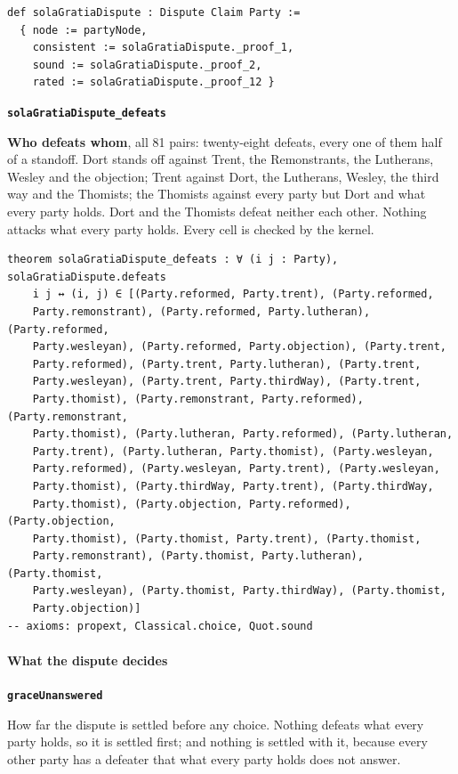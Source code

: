 \documentclass[11pt]{article}
\begin{document}
{\small\begin{verbatim}
def solaGratiaDispute : Dispute Claim Party :=
  { node := partyNode,
    consistent := solaGratiaDispute._proof_1,
    sound := solaGratiaDispute._proof_2,
    rated := solaGratiaDispute._proof_12 }
\end{verbatim}}
\par\medskip\noindent\textbf{\texttt{sola\allowbreak{}Gratia\allowbreak{}Dispute\_\allowbreak{}defeats}}\par\nobreak\noindent
\textbf{Who defeats whom}, all 81 pairs: twenty-eight defeats, every one of them half of a standoff. Dort stands off against Trent, the Remonstrants, the Lutherans, Wesley and the objection; Trent against Dort, the Lutherans, Wesley, the third way and the Thomists; the Thomists against every party but Dort and what every party holds. Dort and the Thomists defeat neither each other. Nothing attacks what every party holds. Every cell is checked by the kernel.

{\small\begin{verbatim}
theorem solaGratiaDispute_defeats : ∀ (i j : Party), solaGratiaDispute.defeats
    i j ↔ (i, j) ∈ [(Party.reformed, Party.trent), (Party.reformed,
    Party.remonstrant), (Party.reformed, Party.lutheran), (Party.reformed,
    Party.wesleyan), (Party.reformed, Party.objection), (Party.trent,
    Party.reformed), (Party.trent, Party.lutheran), (Party.trent,
    Party.wesleyan), (Party.trent, Party.thirdWay), (Party.trent,
    Party.thomist), (Party.remonstrant, Party.reformed), (Party.remonstrant,
    Party.thomist), (Party.lutheran, Party.reformed), (Party.lutheran,
    Party.trent), (Party.lutheran, Party.thomist), (Party.wesleyan,
    Party.reformed), (Party.wesleyan, Party.trent), (Party.wesleyan,
    Party.thomist), (Party.thirdWay, Party.trent), (Party.thirdWay,
    Party.thomist), (Party.objection, Party.reformed), (Party.objection,
    Party.thomist), (Party.thomist, Party.trent), (Party.thomist,
    Party.remonstrant), (Party.thomist, Party.lutheran), (Party.thomist,
    Party.wesleyan), (Party.thomist, Party.thirdWay), (Party.thomist,
    Party.objection)]
-- axioms: propext, Classical.choice, Quot.sound
\end{verbatim}}
\paragraph*{What the dispute decides}
\leavevmode\par\nobreak
\par\medskip\noindent\textbf{\texttt{grace\allowbreak{}Unanswered}}\par\nobreak\noindent
How far the dispute is settled before any choice. Nothing defeats what every party holds, so it is settled first; and nothing is settled with it, because every other party has a defeater that what every party holds does not answer.
\end{document}
